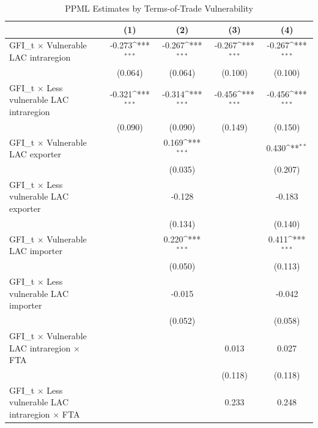 \begin{table}[htbp]\centering
\def\sym#1{\ifmmode^{#1}\else\(^{#1}\)\fi}
\caption{PPML Estimates by Terms-of-Trade Vulnerability}
\begin{tabular}{l*{4}{c}}
\hline\hline
          &\multicolumn{1}{c}{(1)}         &\multicolumn{1}{c}{(2)}         &\multicolumn{1}{c}{(3)}         &\multicolumn{1}{c}{(4)}         \\
\hline
GFI\_t × Vulnerable LAC intraregion&   -0.273\sym{***}&   -0.267\sym{***}&   -0.267\sym{***}&   -0.267\sym{***}\\
          &  (0.064)         &  (0.064)         &  (0.100)         &  (0.100)         \\
[1em]
GFI\_t × Less vulnerable LAC intraregion&   -0.321\sym{***}&   -0.314\sym{***}&   -0.456\sym{***}&   -0.456\sym{***}\\
          &  (0.090)         &  (0.090)         &  (0.149)         &  (0.150)         \\
[1em]
GFI\_t × Vulnerable LAC exporter&                  &    0.169\sym{***}&                  &    0.430\sym{**} \\
          &                  &  (0.035)         &                  &  (0.207)         \\
[1em]
GFI\_t × Less vulnerable LAC exporter&                  &   -0.128         &                  &   -0.183         \\
          &                  &  (0.134)         &                  &  (0.140)         \\
[1em]
GFI\_t × Vulnerable LAC importer&                  &    0.220\sym{***}&                  &    0.411\sym{***}\\
          &                  &  (0.050)         &                  &  (0.113)         \\
[1em]
GFI\_t × Less vulnerable LAC importer&                  &   -0.015         &                  &   -0.042         \\
          &                  &  (0.052)         &                  &  (0.058)         \\
[1em]
GFI\_t × Vulnerable LAC intraregion × FTA&                  &                  &    0.013         &    0.027         \\
          &                  &                  &  (0.118)         &  (0.118)         \\
[1em]
GFI\_t × Less vulnerable LAC intraregion × FTA&                  &                  &    0.233         &    0.248         \\

\end{tabular}
\end{table}
